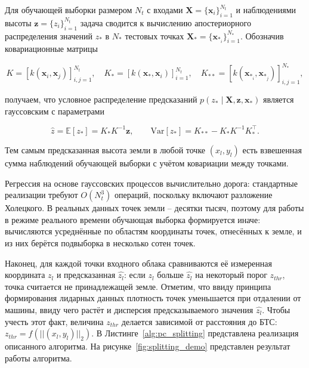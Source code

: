 Для обучающей выборки размером \( N_t \) с входами \( \mathbf{X} = \{\mathbf{x}_i\}_{i=1}^{N_t} \) и наблюдениями высоты \( \mathbf{z} = \{z_i\}_{i=1}^{N_t} \) задача сводится к вычислению апостериорного распределения значений \( z_* \) в \( N_* \) тестовых точках \( \mathbf{X}_* = \{\mathbf{x}_{*_i}\}_{i=1}^{N_*} \). Обозначив ковариационные матрицы

\begin{equation}
K = [k(\mathbf{x}_i, \mathbf{x}_j)]_{i,j=1}^{N_t}, \quad K_* = [k(\mathbf{x}_*,\mathbf{x}_i)]_{i=1}^{N_t}, \quad K_{**} = [k(\mathbf{x}_{*_i},\mathbf{x}_{*_j})]_{i,j=1}^{N_*},\label{eq:cov_gpr}
\end{equation}

получаем, что условное распределение предсказаний \( p(z_* \mid \mathbf{X}, \mathbf{z}, \mathbf{x}_*) \) является гауссовским с параметрами

\begin{equation}
	\widehat{z} = \mathbb{E}[z_*] = K_* K^{-1} \mathbf{z}, \qquad \mathrm{Var}[z_*] = K_{**} - K_* K^{-1} K_*^\top. \label{eq:gpr_predict}
\end{equation}

Тем самым предсказанная высота земли в любой точке \( (x_l, y_l) \) есть взвешенная сумма наблюдений обучающей выборки с учётом ковариации между точками.

Регрессия на основе гауссовских процессов вычислительно дорога: стандартные реализации требуют $O(N_t^3)$ операций, поскольку включают разложение Холецкого. В реальных данных точек земли -- десятки тысяч, поэтому для работы в режиме реального времени обучающая выборка формируется иначе: вычисляются усреднённые по областям координаты точек, отнесённых к земле, и из них берётся подвыборка в несколько сотен точек.

Наконец, для каждой точки входного облака сравниваются её измеренная координата $z_l$ и предсказанная $\widehat{z_l}$: если $z_l$ больше $\widehat{z_l}$ на некоторый порог $z_{thr}$, точка считается не принадлежащей земле. Отметим, что ввиду принципа формирования лидарных данных плотность точек уменьшается при отдалении от машины, ввиду чего растёт и дисперсия предсказываемого значения $\widehat{z_l}$. Чтобы учесть этот факт, величина $z_{thr}$ делается зависимой от расстояния до БТС: $z_{thr} = f(||(x_l, y_l)||_2)$. В Листинге~\ref{alg:pc_splitting} представлена реализация описанного алгоритма. На рисунке~\cref{fig:splitting_demo} представлен результат работы алгоритма. 

